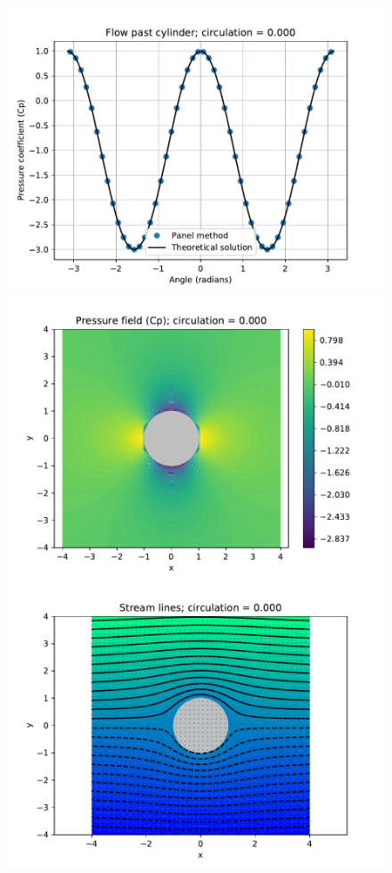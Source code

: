 \documentclass[10pt]{article}
\begin{document}
\begin{figure}[H]
\begin{center}
\includegraphics[scale=.4]{plots/cylinder_cp_boundary.pdf}
\includegraphics[scale=.4]{plots/cylinder_cp_field.pdf}
\includegraphics[scale=.4]{plots/cylinder_stream_lines.pdf}

\end{center}
\end{figure}
\end{document}
